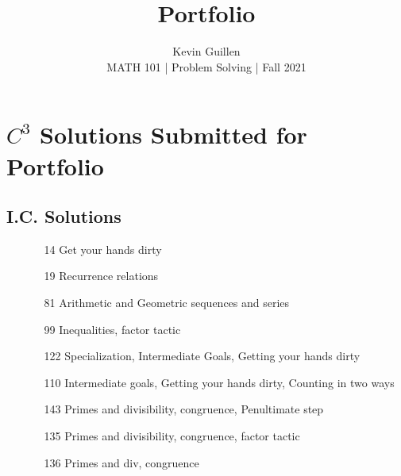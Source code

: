 \documentclass[11pt]{article}
\begin{document}
 
\title{Portfolio}
\author{Kevin Guillen\\[0.5em]
MATH 101 | Problem Solving | Fall 2021}
\date{} 
\maketitle
\newpage

\tableofcontents
\newpage
\section{$C^{3}$ Solutions Submitted for Portfolio}
\subsection{I.C. Solutions}
\begin{itemize}
    \item[\text{Oct 4 Sub. }]  \begin{itemize}
        \item[14] Get your hands dirty
        \item[19] Recurrence relations
    \end{itemize}
    \item[\text{Nov 1 Sub. }] \begin{itemize}
        \item[81] Arithmetic and Geometric sequences and series
        \item[99] Inequalities, factor tactic
    \end{itemize}
    \item[\text{Nov 8 Sub. }]  \begin{itemize}
        \item[122] Specialization, Intermediate Goals, Getting your hands dirty
        \item[110] Intermediate goals, Getting your hands dirty, Counting in two ways
    \end{itemize}
    \item[\text{Nov 15 Sub. }] \begin{itemize}
        \item[143] Primes and divisibility, congruence, Penultimate step
    \end{itemize}
    \item[\text{Nov 19 ReSub. }] \begin{itemize}
        \item[135] Primes and divisibility, congruence, factor tactic
        \item[136] Primes and div, congruence

\end{itemize}
\end{itemize}
\end{document}
